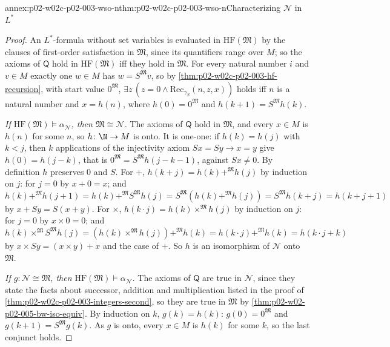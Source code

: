 \begin{annexitem}{annex:p02-w02c-p02-003-wso-n}{thm:p02-w02c-p02-003-wso-n}{Characterizing \(\mathcal N\) in \(L^{*}\)}
\begin{proof}
An \(L^{*}\)-formula without set variables is evaluated in
\(\mathrm{HF}(\mathfrak M)\) by the clauses of first-order satisfaction in
\(\mathfrak M\), since its quantifiers range over \(M\); so the axioms of
\(\mathsf Q\) hold in \(\mathrm{HF}(\mathfrak M)\) iff they hold in
\(\mathfrak M\).  For every natural number \(i\) and \(v\in M\) exactly one
\(w\in M\) has \(w=S^{\mathfrak M}v\), so by
\cref{thm:p02-w02c-p02-003-hf-recursion}, with start value
\(0^{\mathfrak M}\), \(\exists z\,(z=0\land\mathrm{Rec}_{\gamma_S}(n,z,x))\)
holds iff \(n\) is a natural number and \(x=h(n)\), where
\(h(0)=0^{\mathfrak M}\) and \(h(k+1)=S^{\mathfrak M}h(k)\).

\emph{If \(\mathrm{HF}(\mathfrak M)\models\alpha_{\mathcal N}\), then
\(\mathfrak M\cong\mathcal N\).}  The axioms of \(\mathsf Q\) hold in
\(\mathfrak M\), and every \(x\in M\) is \(h(n)\) for some \(n\), so
\(h\colon\N\to M\) is onto.  It is one-one: if \(h(k)=h(j)\) with \(k<j\),
then \(k\) applications of the injectivity axiom \(Sx=Sy\to x=y\) give
\(h(0)=h(j-k)\), that is \(0^{\mathfrak M}=S^{\mathfrak M}h(j-k-1)\),
against \(Sx\neq0\).  By definition \(h\) preserves \(0\) and \(S\).  For
\(+\), \(h(k+j)=h(k)+^{\mathfrak M}h(j)\) by induction on \(j\): for
\(j=0\) by \(x+0=x\); and \(h(k)+^{\mathfrak M}h(j+1)
=h(k)+^{\mathfrak M}S^{\mathfrak M}h(j)
=S^{\mathfrak M}(h(k)+^{\mathfrak M}h(j))=S^{\mathfrak M}h(k+j)=h(k+j+1)\)
by \(x+Sy=S(x+y)\).  For \(\times\), \(h(k\cdot j)=h(k)\times^{\mathfrak
M}h(j)\) by induction on \(j\): for \(j=0\) by \(x\times0=0\); and
\(h(k)\times^{\mathfrak M}S^{\mathfrak M}h(j)
=(h(k)\times^{\mathfrak M}h(j))+^{\mathfrak M}h(k)
=h(k\cdot j)+^{\mathfrak M}h(k)=h(k\cdot j+k)\) by
\(x\times Sy=(x\times y)+x\) and the case of \(+\).  So \(h\) is an
isomorphism of \(\mathcal N\) onto \(\mathfrak M\).

\emph{If \(g\colon\mathcal N\cong\mathfrak M\), then
\(\mathrm{HF}(\mathfrak M)\models\alpha_{\mathcal N}\).}  The axioms of
\(\mathsf Q\) are true in \(\mathcal N\), since they state the facts about
successor, addition and multiplication listed in the proof of
\cref{thm:p02-w02c-p02-003-integers-second}, so they are true in
\(\mathfrak M\) by \cref{thm:p02-w02-p02-005-bw-iso-equiv}.  By induction on
\(k\), \(g(k)=h(k)\): \(g(0)=0^{\mathfrak M}\) and
\(g(k+1)=S^{\mathfrak M}g(k)\).  As \(g\) is onto, every \(x\in M\) is
\(h(k)\) for some \(k\), so the last conjunct holds.
\end{proof}
\end{annexitem}


